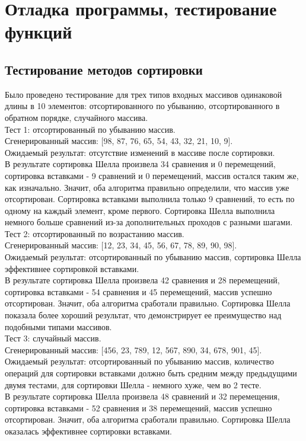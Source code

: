 \documentclass[a4paper,12pt,titlepage,finall]{article}
\begin{document}
\section{Отладка программы, тестирование функций}
\subsection{Тестирование методов сортировки}
Было проведено тестирование для трех типов входных массивов одинаковой длины в 10 элементов: отсортированного по убыванию, отсортированного в обратном порядке, случайного массива.
\\

Тест 1: отсортированный по убыванию массив. \\
Сгенерированный массив: [98, 87, 76, 65, 54, 43, 32, 21, 10, 9]. \\
Ожидаемый результат: отсутствие изменений в массиве после сортировки.
\\ В результате сортировка Шелла произвела 34 сравнения и 0 перемещений, сортировка вставками - 9 сравнений и 0 перемещений, массив остался таким же, как изначально.
Значит, оба алгоритма правильно определили, что массив уже отсортирован. Сортировка вставками выполнила только 9 сравнений, то есть по одному на каждый элемент, кроме первого. Сортировка Шелла выполнила немного больше сравнений из-за дополнительных проходов с разными шагами.
\\

Тест 2: отсортированный по возрастанию массив. \\
Сгенерированный массив: [12, 23, 34, 45, 56, 67, 78, 89, 90, 98]. \\
Ожидаемый результат: отсортированный по убыванию массив, сортировка Шелла эффективнее сортировкой вставками. \\
В результате сортировка Шелла произвела 42 сравнения и 28 перемещений, сортировка вставками - 54 сравнения и 45 перемещений, массив успешно отсортирован.
Значит, оба алгоритма сработали правильно. Сортировка Шелла показала более хороший результат, что демонстрирует ее преимущество над подобными типами массивов.
\\

Тест 3: случайный массив. \\
Сгенерированный массив: [456, 23, 789, 12, 567, 890, 34, 678, 901, 45]. \\
Ожидаемый результат: отсортированный по убыванию массив, количество операций для сортировки вставками должно быть средним между предыдущими двумя тестами, для сортировки Шелла - немного хуже, чем во 2 тесте. \\
В результате сортировка Шелла произвела 48 сравнений и 32 перемещения, сортировка вставками - 52 сравнения и 38 перемещений, массив успешно отсортирован.
Значит, оба алгоритма сработали правильно. Сортировка Шелла оказалась эффективнее сортировки вставками.
\end{document}
